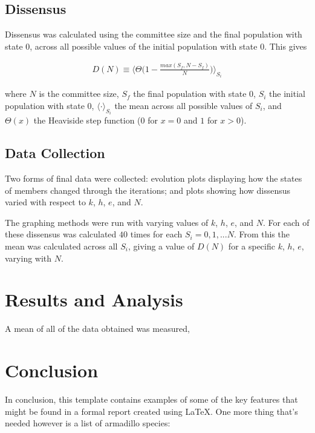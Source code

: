 \documentclass[a4paper, 10pt]{IEEEtran}
\begin{document}
\subsection{Dissensus}
\label{sub:dissensus}

Dissensus was calculated using the committee size and the final population with state $0$, across all possible values of the initial population with  state $0$.  This gives

\begin{align}
\label{eq:dissensus}
D(N) \equiv \Biggl\langle \Theta \Biggl(1 - \frac{max(S_f, N - S_f)}{N}\Biggr)\Biggr \rangle_{S_i}
\end{align}

where $N$ is the committee size, $S_f$ the final population with  state $0$, $S_i$ the initial population with state $0$, $\langle \cdot \rangle_{S_i}$ the mean across all possible values of $S_i$, and $\Theta (x)$ the Heaviside step function ($0$ for $x = 0$ and $1$ for $x > 0$). 


\subsection{Data Collection}
\label{sub:datacollection}

Two forms of final data were collected: evolution plots displaying how the states of members changed through the iterations; and plots showing how dissensus varied with respect to $k$, $h$, $e$, and $N$.\par

The graphing methods were run with varying values of $k$, $h$, $e$, and $N$. For each of these dissensus was calculated $40$ times for each $S_i = 0, 1,... N$. From this the mean was calculated across all $S_i$, giving a value of $D(N)$ for a specific $k$, $h$, $e$, varying with $N$.

\section{Results and Analysis}
\label{sec:resultsanalysis}

A mean of all of the data obtained was measured, 

\section{Conclusion}
\label{sec:conclusion}

In conclusion, this template contains examples of some of the key features that might be found in a formal report created using \LaTeX. One more thing that's needed however is a list of armadillo species:
\end{document}
